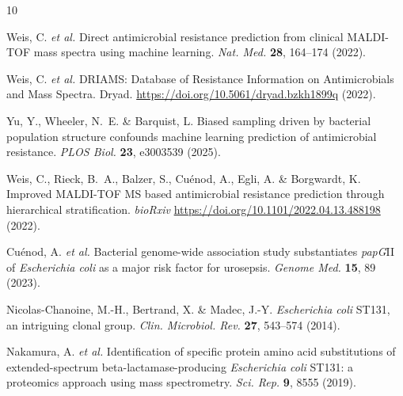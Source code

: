 \documentclass[11pt]{article}
\begin{document}
\begin{thebibliography}{10}

Weis, C. \textit{et al.} Direct antimicrobial resistance prediction from clinical MALDI-TOF mass spectra using machine learning. \textit{Nat. Med.} \textbf{28}, 164--174 (2022).

Weis, C. \textit{et al.} DRIAMS: Database of Resistance Information on Antimicrobials and Mass Spectra. Dryad. \url{https://doi.org/10.5061/dryad.bzkh1899q} (2022).

Yu, Y., Wheeler, N.~E. \& Barquist, L. Biased sampling driven by bacterial population structure confounds machine learning prediction of antimicrobial resistance. \textit{PLOS Biol.} \textbf{23}, e3003539 (2025).

Weis, C., Rieck, B.~A., Balzer, S., Cu\'{e}nod, A., Egli, A. \& Borgwardt, K. Improved MALDI-TOF MS based antimicrobial resistance prediction through hierarchical stratification. \textit{bioRxiv} \url{https://doi.org/10.1101/2022.04.13.488198} (2022).

Cu\'{e}nod, A. \textit{et al.} Bacterial genome-wide association study substantiates \textit{papG}II of \textit{Escherichia coli} as a major risk factor for urosepsis. \textit{Genome Med.} \textbf{15}, 89 (2023).

Nicolas-Chanoine, M.-H., Bertrand, X. \& Madec, J.-Y. \textit{Escherichia coli} ST131, an intriguing clonal group. \textit{Clin. Microbiol. Rev.} \textbf{27}, 543--574 (2014).

Nakamura, A. \textit{et al.} Identification of specific protein amino acid substitutions of extended-spectrum beta-lactamase-producing \textit{Escherichia coli} ST131: a proteomics approach using mass spectrometry. \textit{Sci. Rep.} \textbf{9}, 8555 (2019).

\end{thebibliography}
\end{document}
